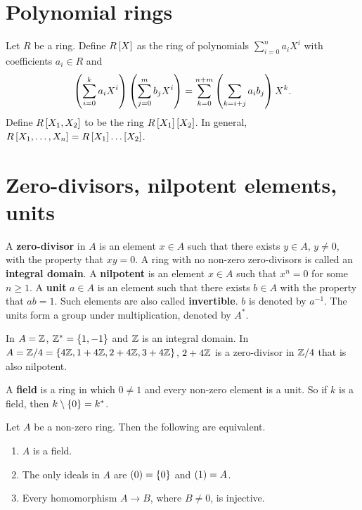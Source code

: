 \pagebreak

\section{Polynomial rings}

Let $ R $ be a ring. Define $ R\sbr{X} $ as the ring of polynomials $ \sum_{i = 0}^n a_iX^i $ with coefficients $ a_i \in R $ and
$$ \br{\sum_{i = 0}^k a_iX^i}\br{\sum_{j = 0}^m b_jX^i} = \sum_{k = 0}^{n + m} \br{\sum_{k = i + j} a_ib_j}X^k. $$
Define $ R\sbr{X_1, X_2} $ to be the ring $ R\sbr{X_1}\sbr{X_2} $. In general, $ R\sbr{X_1, \dots, X_n} = R\sbr{X_1} \dots \sbr{X_2} $.

\section{Zero-divisors, nilpotent elements, units}

\begin{definition}
A \textbf{zero-divisor} in $ A $ is an element $ x \in A $ such that there exists $ y \in A $, $ y \ne 0 $, with the property that $ xy = 0 $. A ring with no non-zero zero-divisors is called an \textbf{integral domain}. A \textbf{nilpotent} is an element $ x \in A $ such that $ x^n = 0 $ for some $ n \ge 1 $. A \textbf{unit} $ a \in A $ is an element such that there exists $ b \in A $ with the property that $ ab = 1 $. Such elements are also called \textbf{invertible}. $ b $ is denoted by $ a^{-1} $. The units form a group under multiplication, denoted by $ A^* $.
\end{definition}

\begin{example*}
In $ A = \mathbb{Z} $, $ \Z^* = \cbr{1, -1} $ and $ \mathbb{Z} $ is an integral domain. In $ A = \Z / 4 = \cbr{4\Z, 1 + 4\Z, 2 + 4\Z, 3 + 4\Z} $, $ 2 + 4\mathbb{Z} $ is a zero-divisor in $ \mathbb{Z} / 4 $ that is also nilpotent.
\end{example*}


\begin{definition}
A \textbf{field} is a ring in which $ 0 \ne 1 $ and every non-zero element is a unit. So if $ k $ is a field, then $ k \setminus \cbr{0} = k^* $.
\end{definition}

\begin{proposition}
Let $ A $ be a non-zero ring. Then the following are equivalent.
\begin{enumerate}
\item $ A $ is a field.
\item The only ideals in $ A $ are $ \br{0} = \cbr{0} $ and $ \br{1} = A $.
\item Every homomorphism $ A \to B $, where $ B \ne 0 $, is injective.
\end{enumerate}
\end{proposition}

